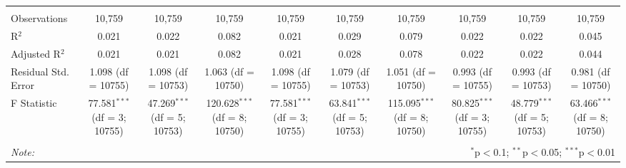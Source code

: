 \begin{table}[!htbp]
\begin{tabular}{@{\extracolsep{5pt}}lccccccccc}
 \hline \\[-1.8ex] 
Observations & 10,759 & 10,759 & 10,759 & 10,759 & 10,759 & 10,759 & 10,759 & 10,759 & 10,759 \\ 
R$^{2}$ & 0.021 & 0.022 & 0.082 & 0.021 & 0.029 & 0.079 & 0.022 & 0.022 & 0.045 \\ 
Adjusted R$^{2}$ & 0.021 & 0.021 & 0.082 & 0.021 & 0.028 & 0.078 & 0.022 & 0.022 & 0.044 \\ 
Residual Std. Error & 1.098 (df = 10755) & 1.098 (df = 10753) & 1.063 (df = 10750) & 1.098 (df = 10755) & 1.079 (df = 10753) & 1.051 (df = 10750) & 0.993 (df = 10755) & 0.993 (df = 10753) & 0.981 (df = 10750) \\ 
F Statistic & 77.581$^{***}$ (df = 3; 10755) & 47.269$^{***}$ (df = 5; 10753) & 120.628$^{***}$ (df = 8; 10750) & 77.581$^{***}$ (df = 3; 10755) & 63.841$^{***}$ (df = 5; 10753) & 115.095$^{***}$ (df = 8; 10750) & 80.825$^{***}$ (df = 3; 10755) & 48.779$^{***}$ (df = 5; 10753) & 63.466$^{***}$ (df = 8; 10750) \\ 
\hline 
\hline \\[-1.8ex] 
\textit{Note:}  & \multicolumn{9}{r}{$^{*}$p$<$0.1; $^{**}$p$<$0.05; $^{***}$p$<$0.01} \\ 
\end{tabular} 
\end{table} 

